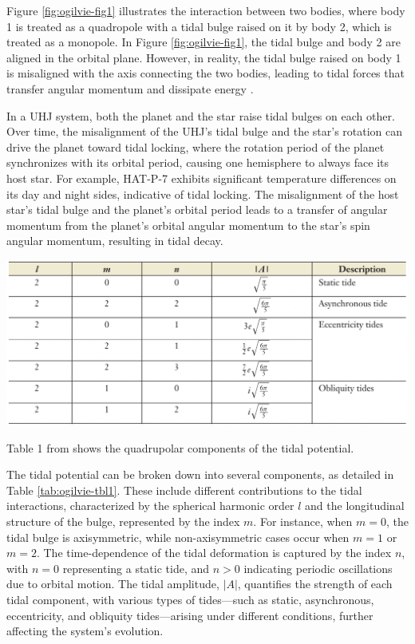 \documentclass[oneside,12pt]{amsart}
\numberwithin{page}{section}
\begin{document}
Figure \ref{fig:ogilvie-fig1} illustrates the interaction between two bodies, where body 1 is treated as a quadropole with a tidal bulge raised on it by body 2, which is treated as a monopole. In Figure \ref{fig:ogilvie-fig1}, the tidal bulge and body 2 are aligned in the orbital plane. However, in reality, the tidal bulge raised on body 1 is misaligned with the axis connecting the two bodies, leading to tidal forces that transfer angular momentum and dissipate energy \citep{ogilvie2014tidal}.

In a UHJ system, both the planet and the star raise tidal bulges on each other. Over time, the misalignment of the UHJ's tidal bulge and the star's rotation can drive the planet toward tidal locking, where the rotation period of the planet synchronizes with its orbital period, causing one hemisphere to always face its host star. For example, HAT-P-7 \citep{helling2019understanding} exhibits significant temperature differences on its day and night sides, indicative of tidal locking. The misalignment of the host star's tidal bulge and the planet's orbital period leads to a transfer of angular momentum from the planet's orbital angular momentum to the star's spin angular momentum, resulting in tidal decay.

\begin{table}[htbp]
    \centering
    \includegraphics[width=0.9\linewidth]{figs/ogilvie_tbl1.png}
    \caption{Table 1 from \citep{ogilvie2014tidal} shows the quadrupolar components of the tidal potential.}
    \label{tab:ogilvie-tbl1}
\end{table}

The tidal potential can be broken down into several components, as detailed in Table \ref{tab:ogilvie-tbl1}. These include different contributions to the tidal interactions, characterized by the spherical harmonic order $l$ and the longitudinal structure of the bulge, represented by the index $m$. For instance, when $m = 0$, the tidal bulge is axisymmetric, while non-axisymmetric cases occur when $m = 1$ or $m = 2$. The time-dependence of the tidal deformation is captured by the index $n$, with $n = 0$ representing a static tide, and $n > 0$ indicating periodic oscillations due to orbital motion. The tidal amplitude, $|A|$, quantifies the strength of each tidal component, with various types of tides—such as static, asynchronous, eccentricity, and obliquity tides—arising under different conditions, further affecting the system’s evolution.
\end{document}
